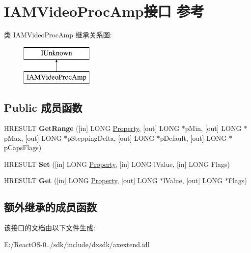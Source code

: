\hypertarget{interface_i_a_m_video_proc_amp}{}\section{I\+A\+M\+Video\+Proc\+Amp接口 参考}
\label{interface_i_a_m_video_proc_amp}
类 I\+A\+M\+Video\+Proc\+Amp 继承关系图\+:\begin{figure}[H]
\begin{center}
\leavevmode
\includegraphics[height=2.000000cm]{interface_i_a_m_video_proc_amp}
\end{center}
\end{figure}
\subsection*{Public 成员函数}
\begin{DoxyCompactItemize}
\item 
\mbox{\label{interface_i_a_m_video_proc_amp_addfbbed146142c05ea9331bcf3fb1269}} 
H\+R\+E\+S\+U\+LT {\bfseries Get\+Range} (\mbox{[}in\mbox{]} L\+O\+NG \hyperlink{struct_property}{Property}, \mbox{[}out\mbox{]} L\+O\+NG $\ast$p\+Min, \mbox{[}out\mbox{]} L\+O\+NG $\ast$p\+Max, \mbox{[}out\mbox{]} L\+O\+NG $\ast$p\+Stepping\+Delta, \mbox{[}out\mbox{]} L\+O\+NG $\ast$p\+Default, \mbox{[}out\mbox{]} L\+O\+NG $\ast$p\+Caps\+Flags)
\item 
\mbox{\label{interface_i_a_m_video_proc_amp_a46fa8b96a83c412b05b62e1238e3345e}} 
H\+R\+E\+S\+U\+LT {\bfseries Set} (\mbox{[}in\mbox{]} L\+O\+NG \hyperlink{struct_property}{Property}, \mbox{[}in\mbox{]} L\+O\+NG l\+Value, \mbox{[}in\mbox{]} L\+O\+NG Flags)
\item 
\mbox{\label{interface_i_a_m_video_proc_amp_a76951c11f0227deb9cb3a770a6856761}} 
H\+R\+E\+S\+U\+LT {\bfseries Get} (\mbox{[}in\mbox{]} L\+O\+NG \hyperlink{struct_property}{Property}, \mbox{[}out\mbox{]} L\+O\+NG $\ast$l\+Value, \mbox{[}out\mbox{]} L\+O\+NG $\ast$Flags)
\end{DoxyCompactItemize}
\subsection*{额外继承的成员函数}


该接口的文档由以下文件生成\+:\begin{DoxyCompactItemize}
\item 
E\+:/\+React\+O\+S-\/0../sdk/include/dxsdk/axextend.\+idl\end{DoxyCompactItemize}
